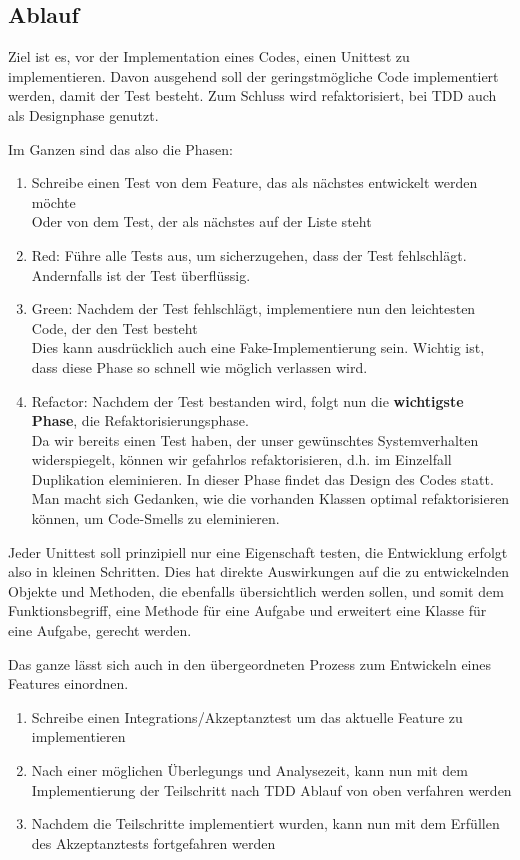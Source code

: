 \subsection{Ablauf}
  Ziel ist es, vor der Implementation eines Codes, einen Unittest zu implementieren. Davon ausgehend soll der geringstmögliche Code implementiert werden, damit der Test besteht. Zum Schluss wird refaktorisiert, bei TDD auch als Designphase genutzt.
  
  Im Ganzen sind das also die Phasen:
  \begin{enumerate}
   \item Schreibe einen Test von dem Feature, das als nächstes entwickelt werden möchte\\Oder von dem Test, der als nächstes auf der Liste steht
   \item Red: Führe alle Tests aus, um sicherzugehen, dass der Test fehlschlägt. Andernfalls ist der Test überflüssig.
   \item Green: Nachdem der Test fehlschlägt, implementiere nun den leichtesten Code, der den Test besteht\\
   Dies kann ausdrücklich auch eine Fake-Implementierung sein. Wichtig ist, dass diese Phase so schnell wie möglich verlassen wird.
   \item Refactor: Nachdem der Test bestanden wird, folgt nun die \textbf{wichtigste Phase}, die Refaktorisierungsphase.\\
   Da wir bereits einen Test haben, der unser gewünschtes Systemverhalten widerspiegelt, können wir gefahrlos refaktorisieren, d.h. im Einzelfall Duplikation eleminieren. In dieser Phase findet das Design des Codes statt. Man macht sich Gedanken, wie die vorhanden Klassen optimal refaktorisieren können, um Code-Smells zu eleminieren.
  \end{enumerate}
  
  Jeder Unittest soll prinzipiell nur eine Eigenschaft testen, die Entwicklung erfolgt also in kleinen Schritten. Dies hat direkte Auswirkungen auf die zu entwickelnden Objekte und Methoden, die ebenfalls übersichtlich werden sollen, und somit dem Funktionsbegriff, eine Methode für eine Aufgabe und erweitert eine Klasse für eine Aufgabe, gerecht werden.
  
  
  Das ganze lässt sich auch in den übergeordneten Prozess zum Entwickeln eines Features einordnen.
  \begin{enumerate}
   \item Schreibe einen Integrations/Akzeptanztest um das aktuelle Feature zu implementieren
   \item Nach einer möglichen Überlegungs und Analysezeit, kann nun mit dem Implementierung der Teilschritt nach TDD Ablauf von oben verfahren werden
   \item Nachdem die Teilschritte implementiert wurden, kann nun mit dem Erfüllen des Akzeptanztests fortgefahren werden
  \end{enumerate}
  
